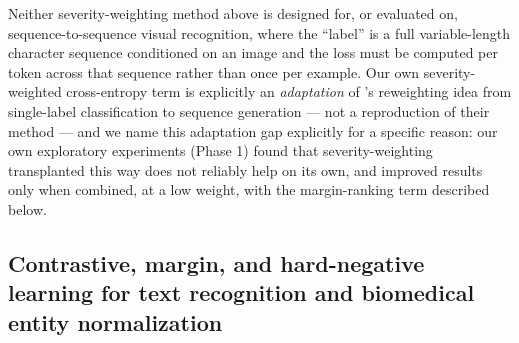 \documentclass[fleqn,10pt]{wlpeerj}
\begin{document}
Neither severity-weighting method above is designed for, or evaluated on, sequence-to-sequence visual recognition, where the ``label'' is a full variable-length character sequence conditioned on an image and the loss must be computed per token across that sequence rather than once per example. Our own severity-weighted cross-entropy term is explicitly an \emph{adaptation} of \citeauthor{mohammadiseif2026risk}'s reweighting idea from single-label classification to sequence generation --- not a reproduction of their method --- and we name this adaptation gap explicitly for a specific reason: our own exploratory experiments (Phase 1) found that severity-weighting transplanted this way does not reliably help on its own, and improved results only when combined, at a low weight, with the margin-ranking term described below.

\subsection*{Contrastive, margin, and hard-negative learning for text recognition and biomedical entity normalization}\label{sec:related-contrastive}
\end{document}
